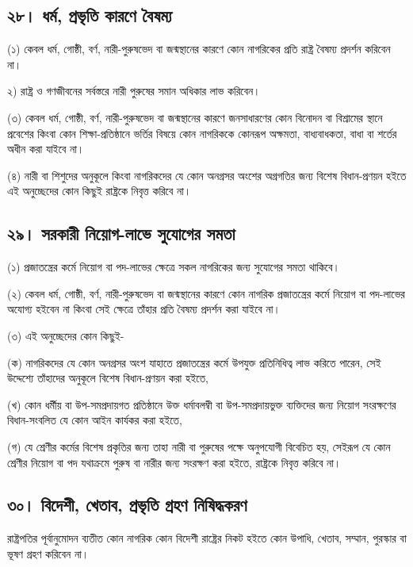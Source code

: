 \documentclass[11pt]{article}
\begin{document}
\subsection{২৮। ধর্ম, প্রভৃতি কারণে বৈষম্য}
\label{sec:org58505dd}
(১) কেবল ধর্ম, গোষ্ঠী, বর্ণ, নারী-পুরুষভেদ বা জন্মস্থানের কারণে কোন নাগরিকের
    প্রতি রাষ্ট্র বৈষম্য প্রদর্শন করিবেন না।

২) রাষ্ট্র ও গণজীবনের সর্বস্তরে নারী পুরুষের সমান অধিকার লাভ করিবেন।

(৩) কেবল ধর্ম, গোষ্ঠী, বর্ণ, নারী-পুরুষভেদ বা জন্মস্থানের কারণে জনসাধারণের
    কোন বিনোদন বা বিশ্রামের স্থানে প্রবেশের কিংবা কোন শিক্ষা-প্রতিষ্ঠানে ভর্তির
    বিষয়ে কোন নাগরিককে কোনরূপ অক্ষমতা, বাধ্যবাধকতা, বাধা বা শর্তের অধীন করা
    যাইবে না।

(৪) নারী বা শিশুদের অনুকূলে কিংবা নাগরিকদের যে কোন অনগ্রসর অংশের অগ্রগতির
    জন্য বিশেষ বিধান-প্রণয়ন হইতে এই অনুচ্ছেদের কোন কিছুই রাষ্ট্রকে নিবৃত্ত করিবে
    না।

\subsection{২৯। সরকারী নিয়োগ-লাভে সুযোগের সমতা}
\label{sec:orgc97d53c}
(১) প্রজাতন্ত্রের কর্মে নিয়োগ বা পদ-লাভের ক্ষেত্রে সকল নাগরিকের জন্য সুযোগের
    সমতা থাকিবে।

(২) কেবল ধর্ম, গোষ্ঠী, বর্ণ, নারী-পুরুষভেদ বা জন্মস্থানের কারণে কোন নাগরিক
    প্রজাতন্ত্রের কর্মে নিয়োগ বা পদ-লাভের অযোগ্য হইবেন না কিংবা সেই ক্ষেত্রে
    তাঁহার প্রতি বৈষম্য প্রদর্শন করা যাইবে না।

(৩) এই অনুচ্ছেদের কোন কিছুই-

(ক) নাগরিকদের যে কোন অনগ্রসর অংশ যাহাতে প্রজাতন্ত্রের কর্মে উপযুক্ত
    প্রতিনিধিত্ব লাভ করিতে পারেন, সেই উদ্দেশ্যে তাঁহাদের অনুকূলে বিশেষ
    বিধান-প্রণয়ন করা হইতে,

(খ) কোন ধর্মীয় বা উপ-সমপ্রদায়গত প্রতিষ্ঠানে উক্ত ধর্মাবলম্বী বা উপ-সমপ্রদায়ভুক্ত
    ব্যক্তিদের জন্য নিয়োগ সংরক্ষণের বিধান-সংবলিত যে কোন আইন কার্যকর করা হইতে,

(গ) যে শ্রেণীর কর্মের বিশেষ প্রকৃতির জন্য তাহা নারী বা পুরুষের পক্ষে অনুপযোগী
    বিবেচিত হয়, সেইরূপ যে কোন শ্রেণীর নিয়োগ বা পদ যথাক্রমে পুরুষ বা নারীর জন্য
    সংরক্ষণ করা হইতে, রাষ্ট্রকে নিবৃত্ত করিবে না।

\subsection{৩০। বিদেশী, খেতাব, প্রভৃতি গ্রহণ নিষিদ্ধকরণ}
\label{sec:orgcd9580b}
রাষ্ট্রপতির পূর্বানুমোদন ব্যতীত কোন নাগরিক কোন বিদেশী রাষ্ট্রের নিকট হইতে কোন
উপাধি, খেতাব, সম্মান, পুরস্কার বা ভূষণ গ্রহণ করিবেন না।
\end{document}
